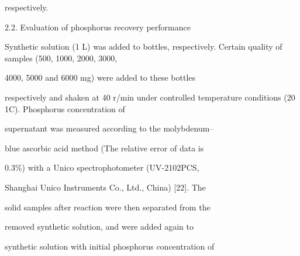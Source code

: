 \documentclass[a4paper,portrait,12pt]{article}
\begin{document}
\begin{flushleft}
respectively.
\end{flushleft}





\begin{flushleft}
2.2. Evaluation of phosphorus recovery performance
\end{flushleft}


\begin{flushleft}
Synthetic solution (1 L) was added to bottles, respectively. Certain quality of samples (500, 1000, 2000, 3000,
\end{flushleft}


\begin{flushleft}
4000, 5000 and 6000 mg) were added to these bottles
\end{flushleft}


\begin{flushleft}
respectively and shaken at 40 r/min under controlled temperature conditions (20 1C). Phosphorus concentration of
\end{flushleft}


\begin{flushleft}
supernatant was measured according to the molybdenum--
\end{flushleft}


\begin{flushleft}
blue ascorbic acid method (The relative error of data is
\end{flushleft}


\begin{flushleft}
0.3\%) with a Unico spectrophotometer (UV-2102PCS,
\end{flushleft}


\begin{flushleft}
Shanghai Unico Instruments Co., Ltd., China) [22]. The
\end{flushleft}


\begin{flushleft}
solid samples after reaction were then separated from the
\end{flushleft}


\begin{flushleft}
removed synthetic solution, and were added again to
\end{flushleft}


\begin{flushleft}
synthetic solution with initial phosphorus concentration of
\end{flushleft}
\end{document}
